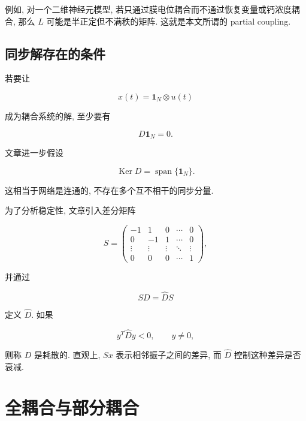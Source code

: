 \documentclass[oneside]{ctexart}
\DeclareMathOperator{\Ker}{Ker}
\DeclareMathOperator{\Span}{span}
\begin{document}
例如, 对一个二维神经元模型, 若只通过膜电位耦合而不通过恢复变量或钙浓度耦合, 那么 $L$ 可能是半正定但不满秩的矩阵. 这就是本文所谓的 partial coupling.

\subsection{同步解存在的条件}

若要让

\begin{equation}
    x(t)=\mathbf{1}_N\otimes u(t)
\end{equation}

成为耦合系统的解, 至少要有

\begin{equation}
    D\mathbf{1}_N=0.
\end{equation}

文章进一步假设

\begin{equation}
    \Ker D=\Span\{\mathbf{1}_N\}.
\end{equation}

这相当于网络是连通的, 不存在多个互不相干的同步分量.

为了分析稳定性, 文章引入差分矩阵

\begin{equation}
    S=
    \begin{pmatrix}
        -1&1&0&\cdots&0\\
        0&-1&1&\cdots&0\\
        \vdots&\vdots&\vdots&\ddots&\vdots\\
        0&0&0&\cdots&1
    \end{pmatrix},
\end{equation}

并通过

\begin{equation}
    SD=\widehat{D}S
\end{equation}

定义 $\widehat{D}$. 如果

\begin{equation}
    y^T\widehat{D}y<0,\qquad y\neq 0,
\end{equation}

则称 $D$ 是耗散的. 直观上, $Sx$ 表示相邻振子之间的差异, 而 $\widehat{D}$ 控制这种差异是否衰减.

\section{全耦合与部分耦合}
\end{document}

